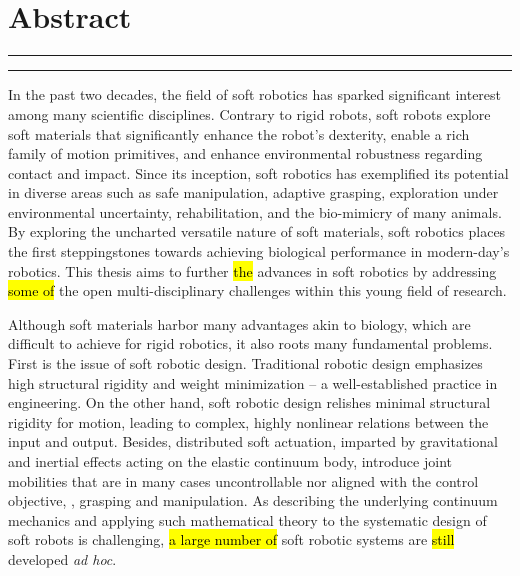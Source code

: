 
\chapter*{\vspace{-45mm}\\ Abstract} %
\vspace{-15mm}
\begin{center}
\rule{\textwidth}{.75pt}\vspace*{1mm}
\textbf{{\large \maintitle}
}
\rule{\textwidth}{.75pt}
\end{center}

\vspace{-2mm}
In the past two decades, the field of soft robotics has sparked significant interest among many scientific disciplines. Contrary to rigid robots, soft robots explore soft materials that significantly enhance the robot's dexterity, enable a rich family of motion primitives, and enhance environmental robustness regarding contact and impact. Since its inception, soft robotics has exemplified its potential in diverse areas such as safe manipulation, adaptive grasping, exploration under environmental uncertainty, rehabilitation, and the bio-mimicry of many animals. By exploring the uncharted versatile nature of soft materials, soft robotics places the first steppingstones towards achieving biological performance in modern-day's robotics. This thesis aims to further \hl{the} advances in soft robotics by addressing \hl{some of} the open multi-disciplinary challenges within this young field of research.

Although soft materials harbor many advantages akin to biology, which are difficult to achieve for rigid robotics, it also roots many fundamental problems. First is the issue of soft robotic design. Traditional robotic design emphasizes high structural rigidity and weight minimization -- a well-established practice in engineering. On the other hand, soft robotic design relishes minimal structural rigidity for motion, leading to complex, highly nonlinear relations between the input and output. Besides, distributed soft actuation, imparted by gravitational and inertial effects acting on the elastic continuum body, introduce joint mobilities that are in many cases uncontrollable nor aligned with the control objective, \eg, grasping and manipulation. As describing the underlying continuum mechanics and applying such mathematical theory to the systematic design of soft robots is challenging, \hl{a large number of} soft robotic systems are \hl{still} developed \textit{ad hoc}. 

